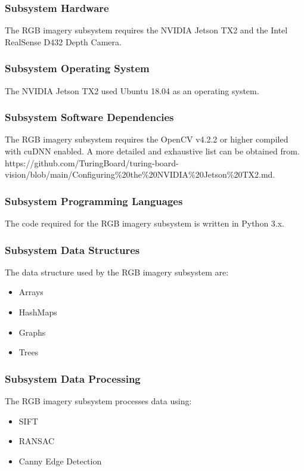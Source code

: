 \subsubsection{Subsystem Hardware}
The RGB imagery subsystem requires the NVIDIA Jetson TX2 and the Intel RealSense  D432 Depth Camera.

\subsubsection{Subsystem Operating System}
The NVIDIA Jetson TX2 used Ubuntu 18.04 as an operating system.  

\subsubsection{Subsystem Software Dependencies}
The RGB imagery subsystem requires the OpenCV v4.2.2 or higher compiled with cuDNN enabled. A more detailed and exhaustive list can be obtained from. https://github.com/TuringBoard/turing-board-vision/blob/main/Configuring\%20the\%20NVIDIA\%20Jetson\%20TX2.md.

\subsubsection{Subsystem Programming Languages}
The code required for the RGB imagery subsystem is written in Python 3.x.

\subsubsection{Subsystem Data Structures}
The data structure used by the RGB imagery subsystem are:
\begin{itemize}
    \item Arrays
    \item HashMaps
    \item Graphs
    \item Trees
\end{itemize}

\subsubsection{Subsystem Data Processing}
The RGB imagery subsystem processes data using:
\begin{itemize}
    \item SIFT
    \item RANSAC
    \item Canny Edge Detection
\end{itemize}

